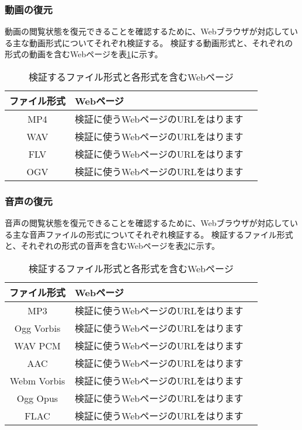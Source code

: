 \subsubsection{動画の復元}
動画の閲覧状態を復元できることを確認するために、Webブラウザが対応している主な動画形式についてそれぞれ検証する。
検証する動画形式と、それぞれの形式の動画を含むWebページを表\ref{tb:evl-video-check-list}に示す。

\begin{table}[htbp]
  \begin{center}
    \caption{検証するファイル形式と各形式を含むWebページ}
    \label{tb:evl-video-check-list}
    \begin{tabular}{|c|l|l|}
      \hline
      ファイル形式 & Webページ \\\hline\hline
      MP4 & 検証に使うWebページのURLをはります \\\hline
      WAV & 検証に使うWebページのURLをはります \\\hline
      FLV & 検証に使うWebページのURLをはります \\\hline
      OGV & 検証に使うWebページのURLをはります \\\hline
    \end{tabular}
  \end{center}
\end{table}

\subsubsection{音声の復元}
音声の閲覧状態を復元できることを確認するために、Webブラウザが対応している主な音声ファイルの形式についてそれぞれ検証する。
検証するファイル形式と、それぞれの形式の音声を含むWebページを表\ref{tb:evl-audio-check-list}に示す。

\begin{table}[htbp]
  \begin{center}
    \caption{検証するファイル形式と各形式を含むWebページ}
    \label{tb:evl-audio-check-list}
    \begin{tabular}{|c|l|l|}
      \hline
      ファイル形式 & Webページ \\\hline\hline
      MP3 & 検証に使うWebページのURLをはります \\\hline
      Ogg Vorbis & 検証に使うWebページのURLをはります \\\hline
      WAV PCM & 検証に使うWebページのURLをはります \\\hline
      AAC & 検証に使うWebページのURLをはります \\\hline
      Webm Vorbis & 検証に使うWebページのURLをはります \\\hline
      Ogg Opus & 検証に使うWebページのURLをはります \\\hline
      FLAC & 検証に使うWebページのURLをはります \\\hline
    \end{tabular}
  \end{center}
\end{table}

